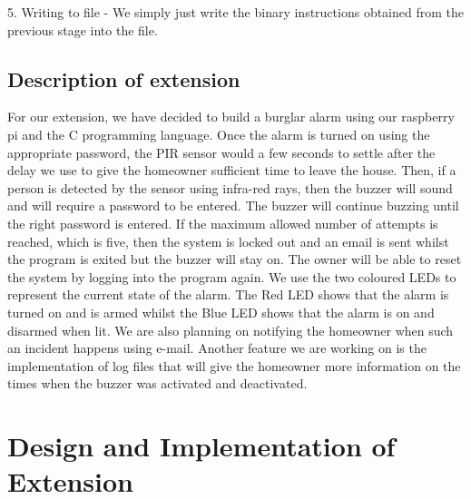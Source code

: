 \documentclass[11pt]{article}
\begin{document}
5. Writing to file - We simply just write the binary instructions obtained from the previous stage into the file.

\subsection{Description of extension}
For our extension, we have decided to build a burglar alarm using our raspberry pi and the C programming language.  Once the alarm is turned on using the appropriate password, the PIR sensor would a few seconds to settle after the delay we use to give the homeowner sufficient time to leave the house. Then, if a person is detected by the sensor using infra-red rays, then the buzzer will sound and will require a password to be entered. The buzzer will continue buzzing until the right password is entered. If the maximum allowed number of attempts is reached, which is five, then the system is locked out and an email is sent whilst the program is exited but the buzzer will stay on. The owner will be able to reset the system by logging into the program again. We use the two coloured LEDs to represent the current state of the alarm. The Red LED shows that the alarm is turned on and is armed whilst the Blue LED shows that the alarm is on and disarmed when lit. We are also planning on notifying the homeowner when such an incident happens using e-mail. Another feature we are working on is the implementation of log files that will give the homeowner more information on the times when the buzzer was activated and deactivated.

\section{Design and Implementation of Extension}
\end{document}

